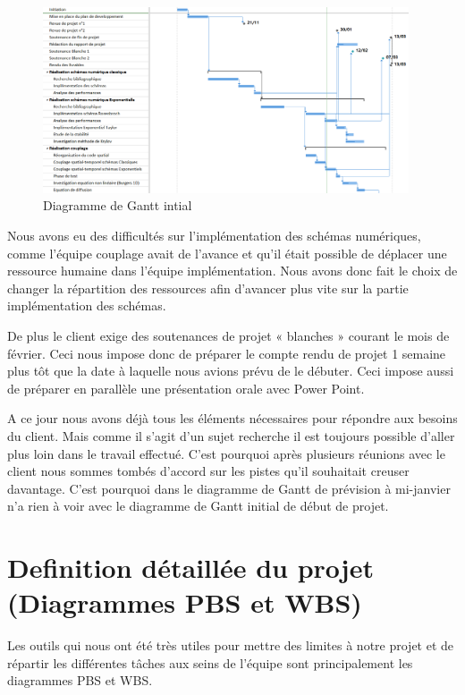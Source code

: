 \documentclass[a4paper,12pt]{report}
\theoremstyle{break}
\begin{document}
  \begin{figure}[h]
\centering
    \includegraphics[width=\textwidth, height=5.5cm]{images/Gantt_revue_2.png}
  	\caption{Diagramme de Gantt intial} 
   \label{fig:Gantt_initial}
\end{figure}

Nous avons eu des difficultés sur l’implémentation des schémas numériques, comme l’équipe couplage avait de l’avance et qu’il était possible de déplacer une ressource humaine dans l’équipe implémentation. Nous avons donc fait le choix de changer la répartition des ressources afin d’avancer plus vite sur la partie implémentation des schémas. 

De plus le client exige des soutenances de projet « blanches » courant le mois de février. Ceci nous impose donc de préparer le compte rendu de projet 1 semaine plus tôt que la date à laquelle nous avions prévu de le débuter. Ceci impose aussi de préparer en parallèle une présentation orale avec Power Point.

A ce jour nous avons déjà tous les éléments nécessaires pour répondre aux besoins du client. Mais comme il s’agit d’un sujet recherche il est toujours possible d’aller plus loin dans le travail effectué. C’est pourquoi après plusieurs réunions avec le client nous sommes tombés d’accord sur les pistes qu’il souhaitait creuser davantage. C’est pourquoi dans le diagramme de Gantt de prévision à mi-janvier n’a rien à voir avec le diagramme de Gantt initial de début de projet. 



\chapter{Definition détaillée du projet (Diagrammes PBS et WBS)}

	Les outils qui nous ont été très utiles pour mettre des limites à notre projet et de répartir les différentes tâches aux seins de l'équipe sont principalement les diagrammes PBS et WBS.\\
	
\end{document}
